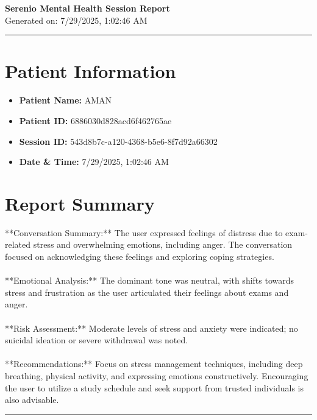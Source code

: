 \documentclass[a4paper,12pt]{article}
\begin{document}
\begin{center}
{\Huge \textbf{Serenio Mental Health Session Report}} \\
\vspace{0.5cm}
{\large Generated on: 7/29/2025, 1:02:46 AM} \\
\vspace{1cm}
\hrule
\end{center}

\section*{Patient Information}
\begin{itemize}
  \item \textbf{Patient Name:} AMAN
  \item \textbf{Patient ID:} 6886030d828acd6f462765ae
  \item \textbf{Session ID:} 543d8b7c-a120-4368-b5e6-8f7d92a66302
  \item \textbf{Date & Time:} 7/29/2025, 1:02:46 AM
\end{itemize}

\section*{Report Summary}
**Conversation Summary:** The user expressed feelings of distress due to exam-related stress and overwhelming emotions, including anger. The conversation focused on acknowledging these feelings and exploring coping strategies. \\  \\ **Emotional Analysis:** The dominant tone was neutral, with shifts towards stress and frustration as the user articulated their feelings about exams and anger. \\  \\ **Risk Assessment:** Moderate levels of stress and anxiety were indicated; no suicidal ideation or severe withdrawal was noted. \\  \\ **Recommendations:** Focus on stress management techniques, including deep breathing, physical activity, and expressing emotions constructively. Encouraging the user to utilize a study schedule and seek support from trusted individuals is also advisable.

\vspace{1cm}
\hrule
\end{document}
